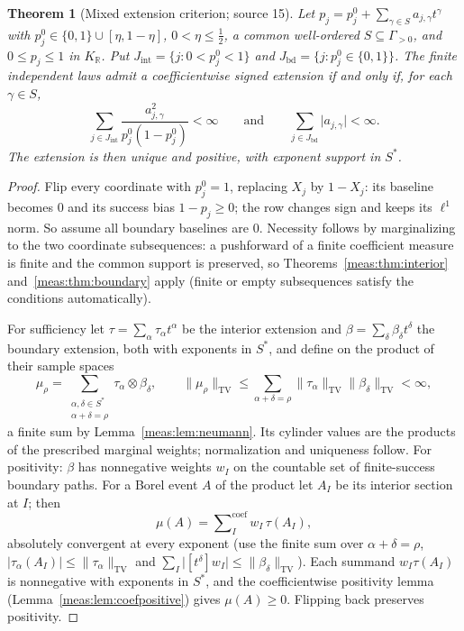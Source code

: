\documentclass[11pt]{article}
\numberwithin{equation}{section}
\newtheorem{theorem}{Theorem}[section]
\theoremstyle{definition}
\theoremstyle{remark}
\newcommand{\R}{\mathbb R}
\newcommand{\KR}{K_{\R}}
\newcommand{\TV}{\mathrm{TV}}
\newcommand{\coef}[2]{[t^{#1}]#2}
\newcommand{\csum}{\mathop{\sum}\nolimits^{\mathrm{coef}}}
\newcommand{\norm}[1]{\lVert#1\rVert}
\newcommand{\abs}[1]{\lvert#1\rvert}
\begin{document}
\begin{theorem}[Mixed extension criterion; source 15]\label{meas:thm:mixed}
Let $p_j=p_j^0+\sum_{\gamma\in S}a_{j,\gamma}t^\gamma$ with $p_j^0\in\{0,1\}\cup[\eta,1-\eta]$,
$0<\eta\le\frac12$, a common well-ordered $S\subseteq\Gamma_{>0}$, and $0\le p_j\le1$
in $\KR$. Put $J_{\mathrm{int}}=\{j:0<p_j^0<1\}$ and
$J_{\mathrm{bd}}=\{j:p_j^0\in\{0,1\}\}$. The finite independent laws admit a
coefficientwise signed extension if and only if, for each $\gamma\in S$,
\begin{equation}\label{meas:eq:mixed}
 \sum_{j\in J_{\mathrm{int}}}\frac{a_{j,\gamma}^2}{p_j^0(1-p_j^0)}<\infty
 \qquad\text{and}\qquad
 \sum_{j\in J_{\mathrm{bd}}}\abs{a_{j,\gamma}}<\infty .
\end{equation}
The extension is then unique and positive, with exponent support in $S^*$.
\end{theorem}
\begin{proof}
Flip every coordinate with $p_j^0=1$, replacing $X_j$ by $1-X_j$: its baseline
becomes $0$ and its success bias $1-p_j\ge0$; the row changes sign and keeps its
$\ell^1$ norm. So assume all boundary baselines are $0$. Necessity follows by
marginalizing to the two coordinate subsequences: a pushforward of a finite
coefficient measure is finite and the common support is preserved, so
Theorems~\ref{meas:thm:interior} and~\ref{meas:thm:boundary} apply (finite or empty
subsequences satisfy the conditions automatically).

For sufficiency let $\tau=\sum_\alpha\tau_\alpha t^\alpha$ be the interior extension and
$\beta=\sum_\delta\beta_\delta t^\delta$ the boundary extension, both with exponents in
$S^*$, and define on the product of their sample spaces
\begin{equation}\label{meas:eq:mixed-tensor}
 \mu_\rho=\sum_{\substack{\alpha,\delta\in S^*\\\alpha+\delta=\rho}}\tau_\alpha\otimes\beta_\delta ,
 \qquad
 \norm{\mu_\rho}_\TV\le\sum_{\alpha+\delta=\rho}\norm{\tau_\alpha}_\TV\norm{\beta_\delta}_\TV<\infty,
\end{equation}
a finite sum by Lemma~\ref{meas:lem:neumann}. Its cylinder values are the
products of the prescribed marginal weights; normalization and uniqueness
follow. For positivity: $\beta$ has nonnegative weights $w_I$ on the countable set
of finite-success boundary paths. For a Borel event $A$ of the product let $A_I$
be its interior section at $I$; then
\begin{equation}\label{meas:eq:mixed-sections}
 \mu(A)=\csum_Iw_I\,\tau(A_I),
\end{equation}
absolutely convergent at every exponent (use the finite sum over
$\alpha+\delta=\rho$, $\abs{\tau_\alpha(A_I)}\le\norm{\tau_\alpha}_\TV$ and
$\sum_I\abs{\coef\delta{w_I}}\le\norm{\beta_\delta}_\TV$). Each summand
$w_I\tau(A_I)$ is nonnegative with exponents in $S^*$, and the
coefficientwise positivity lemma (Lemma~\ref{meas:lem:coefpositive}) gives
$\mu(A)\ge0$. Flipping back preserves positivity.
\end{proof}
\end{document}
